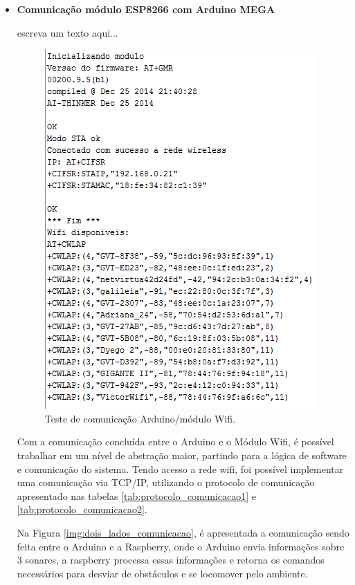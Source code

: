 		\begin{itemize}
			\item \textbf{Comunicação módulo ESP8266 com Arduino MEGA}

				escreva um texto aqui...

				\begin{figure}[H]                                                           
			  		\centering                    
			  		\includegraphics[scale=0.9]{figuras/testeModuloWifi}               
			  		\caption{Teste de comunicação Arduino/módulo Wifi.}    
			  		\label{img:teste_arduino_modulo}                                            
				\end{figure}

				Com a comunicação concluída entre o Arduino e o Módulo Wifi, é possível trabalhar em um nível de abstração maior, partindo para a lógica de software e comunicação do sistema. Tendo acesso a rede wifi, foi possível implementar uma comunicação via TCP/IP, utilizando o protocolo de comunicação apresentado nas tabelas \ref{tab:protocolo_comunicacao1} e \ref{tab:protocolo_comunicacao2}.

				Na Figura \ref{img:dois_lados_comunicacao}, é apresentada a comunicação sendo feita entre o Arduino e a Raspberry, onde o Arduino envia informações sobre 3 sonares, a raspberry processa essas informações e retorna os comandos necessários para desviar de obstáculos e se locomover pelo ambiente.


\end{itemize}
